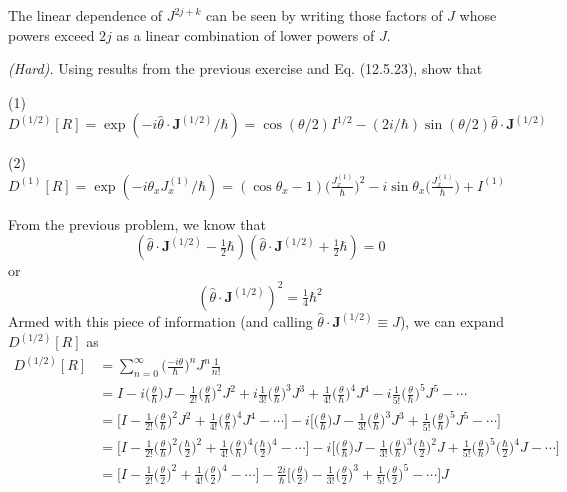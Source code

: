 \documentclass[../principles-of-quantum-mechanics.tex]{subfiles}
\begin{document}
\begin{questions}
\begin{solution}
			The linear dependence of $J^{2j + k}$ can be seen by writing those factors of $J$ whose powers exceed $2j$ as a linear combination of lower powers of $J$.
		\end{solution}
		
		\question \textit{(Hard).} Using results from the previous exercise and Eq. (12.5.23), show that
		
		(1) $D^{(1/2)}[R] = \exp(-i\hat{\theta}\cdot\mathbf{J}^{(1/2)}/\hbar) = \cos(\theta/2)I^{1/2} - (2i/\hbar)\sin(\theta/2)\hat{\theta}\cdot\mathbf{J}^{(1/2)}$
		
		(2) $D^{(1)}[R] = \exp(-i\theta_xJ_x^{(1)}/\hbar) = (\cos\theta_x - 1)\Big(\frac{J_x^{(1)}}{\hbar}\Big)^2 - i\sin\theta_x\Big(\frac{J_x^{(1)}}{\hbar}\Big) + I^{(1)}$
		
		\begin{solution}
			From the previous problem, we know that
			$$(\hat{\theta}\cdot\mathbf{J}^{(1/2)} - \tfrac{1}{2}\hbar)(\hat{\theta}\cdot\mathbf{J}^{(1/2)} + \tfrac{1}{2}\hbar) = 0$$
			or
			$$(\hat{\theta}\cdot\mathbf{J}^{(1/2)})^2 = \tfrac{1}{4}\hbar^2$$
			Armed with this piece of information (and calling $\hat{\theta}\cdot\mathbf{J}^{(1/2)} \equiv J$), we can expand $D^{(1/2)}[R]$ as
			\begin{align*}
				D^{(1/2)}[R] &= \sum_{n=0}^{\infty}\Big({\frac{-i\theta}{\hbar}}\Big)^nJ^n\frac{1}{n!} \\
				&= I - i\Big(\frac{\theta}{\hbar}\Big)J - \frac{1}{2!}\Big(\frac{\theta}{\hbar}\Big)^2J^2 + i\frac{1}{3!}\Big(\frac{\theta}{\hbar}\Big)^3J^3 + \frac{1}{4!}\Big(\frac{\theta}{\hbar}\Big)^4J^4 - i\frac{1}{5!}\Big(\frac{\theta}{\hbar}\Big)^5J^5 - \cdots \\
				&= \Big[I - \frac{1}{2!}\Big(\frac{\theta}{\hbar}\Big)^2J^2 + \frac{1}{4!}\Big(\frac{\theta}{\hbar}\Big)^4J^4 - \cdots\Big] - i\Big[\Big(\frac{\theta}{\hbar}\Big)J - \frac{1}{3!}\Big(\frac{\theta}{\hbar}\Big)^3J^3 + \frac{1}{5!}\Big(\frac{\theta}{\hbar}\Big)^5J^5 - \cdots\Big] \\
				&= \Big[I - \frac{1}{2!}\Big(\frac{\theta}{\hbar}\Big)^2\Big(\frac{\hbar}{2}\Big)^2 + \frac{1}{4!}\Big(\frac{\theta}{\hbar}\Big)^4\Big(\frac{\hbar}{2}\Big)^4 - \cdots\Big] - i\Big[\Big(\frac{\theta}{\hbar}\Big)J - \frac{1}{3!}\Big(\frac{\theta}{\hbar}\Big)^3\Big(\frac{\hbar}{2}\Big)^2J + \frac{1}{5!}\Big(\frac{\theta}{\hbar}\Big)^5\Big(\frac{\hbar}{2}\Big)^4J - \cdots\Big] \\
				&= \Big[I - \frac{1}{2!}\Big(\frac{\theta}{2}\Big)^2 + \frac{1}{4!}\Big(\frac{\theta}{2}\Big)^4 - \cdots\Big] - \frac{2i}{\hbar}\Big[\Big(\frac{\theta}{2}\Big) - \frac{1}{3!}\Big(\frac{\theta}{2}\Big)^3 + \frac{1}{5!}\Big(\frac{\theta}{2}\Big)^5 - \cdots \Big]J \\

\end{align*}
\end{solution}
\end{questions}
\end{document}
